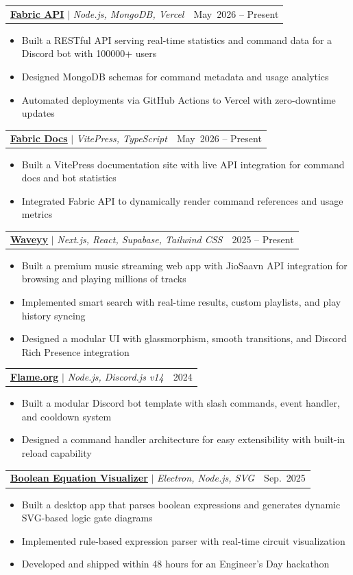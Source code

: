 \documentclass[letterpaper,11pt]{article}
\makeatletter
\newcommand{\resumeItem}[1]{
  \item\small{
    {#1 \vspace{-2pt}}
  }
}
\newcommand{\resumeProjectHeading}[2]{
    \item
    \begin{tabular*}{0.97\textwidth}{l@{\extracolsep{\fill}}r}
      \small#1 & #2 \\
    \end{tabular*}\vspace{-7pt}
}
\newcommand{\resumeItemListStart}{\begin{itemize}}
\newcommand{\resumeItemListEnd}{\end{itemize}\vspace{-5pt}}
\makeatother
\begin{document}
      \resumeProjectHeading
          {\href{https://github.com/godkode69/fabric-api}{\textbf{\underline{Fabric API}}} $|$ \emph{Node.js, MongoDB, Vercel}}{May\ 2026 -- Present}
          \resumeItemListStart
          \resumeItem{Built a RESTful API serving real-time statistics and command data for a Discord bot with 100000+ users}
          \resumeItem{Designed MongoDB schemas for command metadata and usage analytics}
          \resumeItem{Automated deployments via GitHub Actions to Vercel with zero-downtime updates}
          \resumeItemListEnd

      \resumeProjectHeading
          {\href{https://github.com/godkode69/fabric-docs}{\textbf{\underline{Fabric Docs}}} $|$ \emph{VitePress, TypeScript}}{May\ 2026 -- Present}
          \resumeItemListStart
          \resumeItem{Built a VitePress documentation site with live API integration for command docs and bot statistics}
          \resumeItem{Integrated Fabric API to dynamically render command references and usage metrics}
          \resumeItemListEnd

      \resumeProjectHeading
          {\href{https://github.com/siddhartha412/Waveyy}{\textbf{\underline{Waveyy}}} $|$ \emph{Next.js, React, Supabase, Tailwind CSS}}{2025 -- Present}
          \resumeItemListStart
          \resumeItem{Built a premium music streaming web app with JioSaavn API integration for browsing and playing millions of tracks}
          \resumeItem{Implemented smart search with real-time results, custom playlists, and play history syncing}
          \resumeItem{Designed a modular UI with glassmorphism, smooth transitions, and Discord Rich Presence integration}
          \resumeItemListEnd

      \resumeProjectHeading
          {\href{https://github.com/godkode69/flame.org}{\textbf{\underline{Flame.org}}} $|$ \emph{Node.js, Discord.js v14}}{2024}
          \resumeItemListStart
          \resumeItem{Built a modular Discord bot template with slash commands, event handler, and cooldown system}
          \resumeItem{Designed a command handler architecture for easy extensibility with built-in reload capability}
          \resumeItemListEnd

      \resumeProjectHeading
          {\href{https://github.com/godkode69/project-ed}{\textbf{\underline{Boolean Equation Visualizer}}} $|$ \emph{Electron, Node.js, SVG}}{Sep.\ 2025}
          \resumeItemListStart
          \resumeItem{Built a desktop app that parses boolean expressions and generates dynamic SVG-based logic gate diagrams}
          \resumeItem{Implemented rule-based expression parser with real-time circuit visualization}
          \resumeItem{Developed and shipped within 48 hours for an Engineer's Day hackathon}
          \resumeItemListEnd
\end{document}
